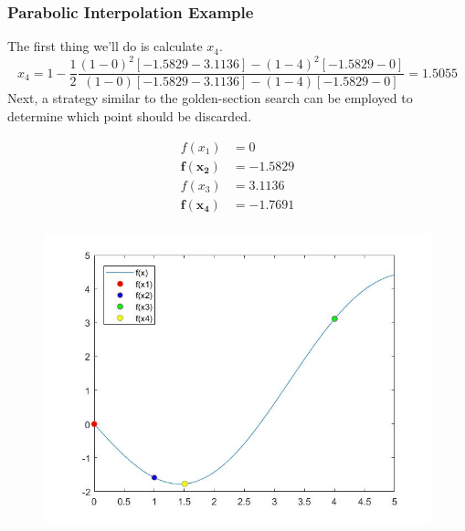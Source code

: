 \documentclass{if-beamer}
\begin{document}
\begin{frame}[t]
	\frametitle{Parabolic Interpolation Example}
	The first thing we'll do is calculate $x_4$.
	$$ x_4 = 1-\frac{1}{2}\frac{(1-0)^2[-1.5829-3.1136]-(1-4)^2[-1.5829-0]}{(1-0)[-1.5829-3.1136]-(1-4)[-1.5829-0]}=1.5055$$	
	Next, a strategy similar to the golden-section search can be employed to determine
	which point should be discarded.\\
	\begin{minipage}{0.5\textwidth}
		\begin{align*}
			f(x_1) &= 0\\
			\mathbf{f(x_2)} &= \mathbf{-1.5829}\\
			f(x_3) &= 3.1136\\
			\mathbf{f(x_4)} &= \mathbf{-1.7691}\\
		\end{align*}
	\end{minipage}
	\begin{minipage}{0.5\textwidth}
		\begin{figure}
			\centering
			\includegraphics[width=\textwidth]{figures/plot2}
		\end{figure}
	\end{minipage}
\end{frame}
\end{document}
